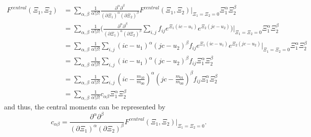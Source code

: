 \begin{equation*}
  \begin{aligned}
    F^{central}(\Xi_1, \Xi_2) & = \sum_{\alpha,\beta} \frac{1}{\alpha!\beta!} \frac{\partial^\alpha\partial^\beta}{{(\partial \Xi_1)}^\alpha{(\partial \Xi_2)}^\beta} F^{central}(\Xi_1, \Xi_2)\Bigr|_{\Xi_1=\Xi_2 = 0} \Xi_1^\alpha \Xi_2^\beta \\
    & = \sum_{\alpha,\beta} \frac{1}{\alpha!\beta!} \Bigg(
      \frac{\partial^\alpha\partial^\beta}{{(\partial \Xi_1)}^\alpha{(\partial \Xi_2)}^\beta}
        \sum_{i,j}f_{ij} e^{\Xi_1 (ic-u_1)} e^{\Xi_2 (jc-u_2)} \Bigg)\Bigr|_{\Xi_1=\Xi_2 = 0} \Xi_1^\alpha \Xi_2^\beta \\
    & = \sum_{\alpha,\beta} \frac{1}{\alpha!\beta!}
      \sum_{i,j} {(ic-u_1)}^\alpha {(jc-u_2)}^\beta f_{ij} e^{\Xi_1 (ic-u_1)} e^{\Xi_2 (jc-u_2)} \Bigr|_{\Xi_1=\Xi_2 = 0} \Xi_1^\alpha \Xi_2^\beta \\
    & = \sum_{\alpha,\beta}
        \frac{1}{\alpha!\beta!}
        \sum_{i,j} {\left(ic - u_1\right)}^\alpha {\left(jc - u_2\right)}^\beta f_{ij} \Xi_1^\alpha \Xi_2^\beta \\
    & = \sum_{\alpha,\beta} \frac{1}{\alpha!\beta!}
      \sum_{i,j} {\left(ic - \frac{m_{10}}{m_{00}}\right)}^\alpha {\left(jc - \frac{m_{01}}{m_{00}}\right)}^\beta f_{ij} \Xi_1^\alpha \Xi_2^\beta \\
    & = \sum_{\alpha,\beta} \frac{1}{\alpha!\beta!} c_{\alpha\beta} \Xi_1^\alpha \Xi_2^\beta
  \end{aligned}
\end{equation*}
%
and thus, the central moments can be represented by
\begin{equation*}
  c_{\alpha\beta} = \frac{\partial^\alpha\partial^\beta}{{(\partial \Xi_1)}^\alpha{(\partial \Xi_2)}^\beta} F^{central}(\Xi_1, \Xi_2)\Bigr|_{\Xi_1=\Xi_2 = 0}.
\end{equation*}

